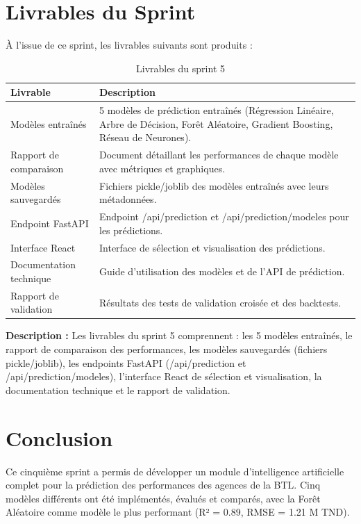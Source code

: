 \section{Livrables du Sprint}
\label{sec:sprint5-livrables}

À l'issue de ce sprint, les livrables suivants sont produits :

\begin{table}[H]
\centering
\begin{tabular}{|p{4cm}|p{9cm}|}
\hline
\textbf{Livrable} & \textbf{Description} \\
\hline
Modèles entraînés & 5 modèles de prédiction entraînés (Régression Linéaire, Arbre de Décision, Forêt Aléatoire, Gradient Boosting, Réseau de Neurones). \\
\hline
Rapport de comparaison & Document détaillant les performances de chaque modèle avec métriques et graphiques. \\
\hline
Modèles sauvegardés & Fichiers pickle/joblib des modèles entraînés avec leurs métadonnées. \\
\hline
Endpoint FastAPI & Endpoint /api/prediction et /api/prediction/modeles pour les prédictions. \\
\hline
Interface React & Interface de sélection et visualisation des prédictions. \\
\hline
Documentation technique & Guide d'utilisation des modèles et de l'API de prédiction. \\
\hline
Rapport de validation & Résultats des tests de validation croisée et des backtests. \\
\hline
\end{tabular}
\caption{Livrables du sprint 5}
\label{tab:sprint5-livrables}
\end{table}



\textbf{Description :} Les livrables du sprint 5 comprennent : les 5 modèles entraînés, le rapport de comparaison des performances, les modèles sauvegardés (fichiers pickle/joblib), les endpoints FastAPI (/api/prediction et /api/prediction/modeles), l'interface React de sélection et visualisation, la documentation technique et le rapport de validation.

\section*{Conclusion}

Ce cinquième sprint a permis de développer un module d'intelligence artificielle complet pour la prédiction des performances des agences de la BTL. Cinq modèles différents ont été implémentés, évalués et comparés, avec la Forêt Aléatoire comme modèle le plus performant (R² = 0.89, RMSE = 1.21 M TND).


